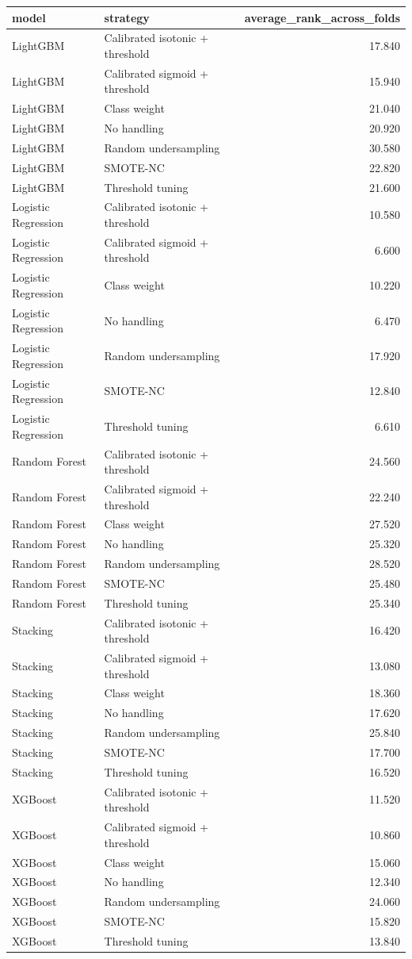 \begin{tabular}{llr}
\toprule
model & strategy & average_rank_across_folds \\
\midrule
LightGBM & Calibrated isotonic + threshold & 17.840 \\
LightGBM & Calibrated sigmoid + threshold & 15.940 \\
LightGBM & Class weight & 21.040 \\
LightGBM & No handling & 20.920 \\
LightGBM & Random undersampling & 30.580 \\
LightGBM & SMOTE-NC & 22.820 \\
LightGBM & Threshold tuning & 21.600 \\
Logistic Regression & Calibrated isotonic + threshold & 10.580 \\
Logistic Regression & Calibrated sigmoid + threshold & 6.600 \\
Logistic Regression & Class weight & 10.220 \\
Logistic Regression & No handling & 6.470 \\
Logistic Regression & Random undersampling & 17.920 \\
Logistic Regression & SMOTE-NC & 12.840 \\
Logistic Regression & Threshold tuning & 6.610 \\
Random Forest & Calibrated isotonic + threshold & 24.560 \\
Random Forest & Calibrated sigmoid + threshold & 22.240 \\
Random Forest & Class weight & 27.520 \\
Random Forest & No handling & 25.320 \\
Random Forest & Random undersampling & 28.520 \\
Random Forest & SMOTE-NC & 25.480 \\
Random Forest & Threshold tuning & 25.340 \\
Stacking & Calibrated isotonic + threshold & 16.420 \\
Stacking & Calibrated sigmoid + threshold & 13.080 \\
Stacking & Class weight & 18.360 \\
Stacking & No handling & 17.620 \\
Stacking & Random undersampling & 25.840 \\
Stacking & SMOTE-NC & 17.700 \\
Stacking & Threshold tuning & 16.520 \\
XGBoost & Calibrated isotonic + threshold & 11.520 \\
XGBoost & Calibrated sigmoid + threshold & 10.860 \\
XGBoost & Class weight & 15.060 \\
XGBoost & No handling & 12.340 \\
XGBoost & Random undersampling & 24.060 \\
XGBoost & SMOTE-NC & 15.820 \\
XGBoost & Threshold tuning & 13.840 \\
\bottomrule
\end{tabular}
